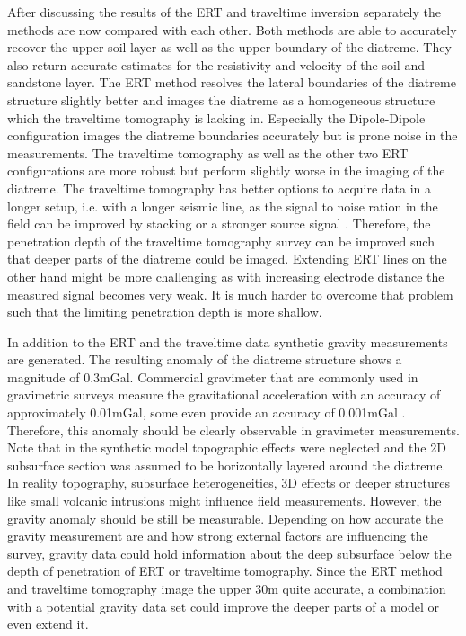 After discussing the results of the ERT and traveltime inversion separately the methods are now compared with each other. Both methods are able to accurately recover the upper soil layer as well as the upper boundary of the diatreme. They also return accurate estimates for the resistivity and velocity of the soil and sandstone layer. The ERT method resolves the lateral boundaries of the diatreme structure slightly better and images the diatreme as a homogeneous structure which the traveltime tomography is lacking in. Especially the Dipole-Dipole configuration images the diatreme boundaries accurately but is prone noise in the measurements. The traveltime tomography as well as the other two ERT configurations are more robust but perform slightly worse in the imaging of the diatreme. The traveltime tomography has better options to acquire data in a longer setup, i.e. with a longer seismic line, as the signal to noise ration in the field can be improved by stacking or a stronger source signal \citep{kearey2002introduction}. Therefore, the penetration depth of the traveltime tomography survey can be improved such that deeper parts of the diatreme could be imaged. Extending ERT lines on the other hand might be more challenging as with increasing electrode distance the measured signal becomes very weak.  It is much harder to overcome that problem such that the limiting penetration depth is more shallow.  

In addition to the ERT and the traveltime data synthetic gravity measurements are generated. The resulting anomaly of the diatreme structure shows a magnitude of 0.3mGal. Commercial gravimeter that are commonly used in gravimetric surveys measure the gravitational acceleration with an accuracy of approximately 0.01mGal, some even provide an accuracy of 0.001mGal \cite{BGR_grav}. Therefore, this anomaly should be clearly observable in gravimeter measurements. Note that in the synthetic model topographic effects were neglected and the 2D subsurface section was assumed to be horizontally layered around the diatreme. In reality topography, subsurface heterogeneities, 3D effects or deeper structures like small volcanic intrusions might influence field measurements. However, the gravity anomaly should be still be measurable. Depending on how accurate the gravity measurement are and how strong external factors are influencing the survey, gravity data could hold information about the deep subsurface below the depth of penetration of ERT or traveltime tomography. Since the ERT method and traveltime tomography image the upper 30m quite accurate, a combination with a potential gravity data set could improve the deeper parts of a model or even extend it.
